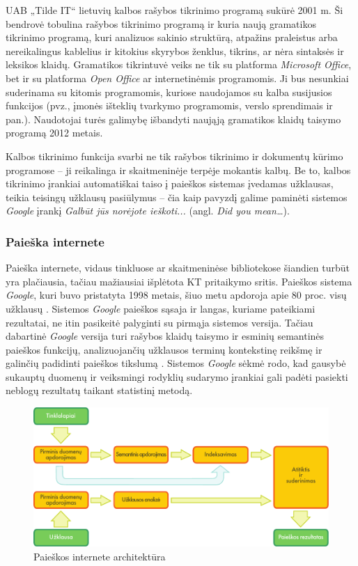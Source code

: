 \begin{multicols}{2}
    UAB „Tilde IT“  lietuvių kalbos rašybos tikrinimo programą sukūrė 2001 m. Ši bendrovė tobulina rašybos tikrinimo programą ir kuria naują gramatikos tikrinimo programą, kuri analizuos sakinio struktūrą, atpažins praleistus arba nereikalingus kablelius ir kitokius skyrybos ženklus, tikrins, ar nėra sintaksės ir leksikos klaidų. Gramatikos tikrintuvė veiks ne tik su platforma \textit{Microsoft Office}, bet ir su platforma \textit{Open Office} ar internetinėmis programomis. Ji bus nesunkiai suderinama su kitomis programomis, kuriose naudojamos su kalba susijusios funkcijos (pvz., įmonės išteklių tvarkymo programomis, verslo sprendimais ir pan.). Naudotojai turės galimybę išbandyti naująją gramatikos klaidų taisymo programą 2012 metais.   

    Kalbos tikrinimo funkcija svarbi ne tik rašybos tikrinimo ir dokumentų kūrimo programose – ji reikalinga ir skaitmeninėje terpėje mokantis kalbų. Be to, kalbos tikrinimo įrankiai automatiškai taiso į paieškos sistemas įvedamas užklausas, teikia teisingų užklausų pasiūlymus – čia kaip pavyzdį galime paminėti sistemos  \textit{Google} įrankį \textit{Galbūt jūs norėjote ieškoti...}  (angl. \textit{Did you mean…}).

\subsubsection{Paieška internete }

 Paieška internete, vidaus tinkluose ar skaitmeninėse bibliotekose šiandien turbūt yra plačiausia, tačiau mažiausiai išplėtota KT pritaikymo sritis. Paieškos sistema \textit{Google}, kuri buvo pristatyta 1998 metais, šiuo metu apdoroja apie 80 proc. visų užklausų \cite{spi1}.  Sistemos \textit{Google} paieškos sąsaja ir langas, kuriame pateikiami rezultatai, ne itin pasikeitė palyginti su pirmąja sistemos versija. Tačiau dabartinė \textit{Google} versija turi rašybos klaidų taisymo ir esminių semantinės paieškos funkcijų, analizuojančių užklausos terminų kontekstinę reikšmę ir galinčių padidinti paieškos tikslumą \cite{pc1}.  Sistemos \textit{Google} sėkmė rodo, kad gausybė sukauptų duomenų ir veiksmingi rodyklių sudarymo įrankiai gali padėti pasiekti neblogų rezultatų taikant statistinį metodą. 

\begin{figure}[htb]
  \center
  \includegraphics[width=\textwidth]{../_media/lithuanian/web_search_architecture}
  \caption{Paieškos internete architektūra}
  \label{fig:websearcharch_de}
\end{figure}


\end{multicols}
